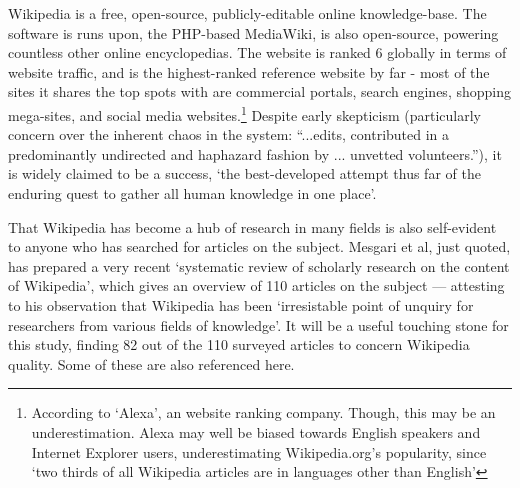 


Wikipedia is a free, open-source, publicly-editable online
knowledge-base. The software is runs upon, the PHP-based MediaWiki, is
also open-source, powering countless other online encyclopedias. The
website is ranked 6 globally in terms of website traffic,
and is the highest-ranked reference website by far - most of the sites
it shares the top spots with are commercial portals, search engines,
shopping mega-sites, and social media websites.\footnote{According to
  `Alexa', an website ranking company.\cite{Alexa-about2014} Though,
  this may be an underestimation. Alexa may well be biased towards
  English speakers and Internet Explorer users, underestimating
  Wikipedia.org's popularity, since `two thirds of all Wikipedia
  articles are in languages other than
  English'\cite{wikimedia-noteonalexa}}\label{sec:popularity} Despite
early skepticism (particularly concern over the inherent chaos in the
system: ``...edits, contributed in a predominantly undirected and
haphazard fashion by ... unvetted volunteers.''\cite{Wilkinson2007}),
it is widely claimed to be a success, `the best-developed attempt thus
far of the enduring quest to gather all human knowledge in one
place'\cite{Mesgari2014}.

That Wikipedia has become a hub of research in many fields is also
self-evident to anyone who has searched for articles on the
subject. Mesgari et al, just quoted, has prepared a very recent
`systematic review of scholarly research on the content of Wikipedia',
which gives an overview of 110 articles on the subject --- attesting
to his observation that Wikipedia has been `irresistable point of
unquiry for researchers from various fields of knowledge'. It will be
a useful touching stone for this study, finding 82 out of the 110
surveyed articles to concern Wikipedia quality. Some of these are also
referenced here.

